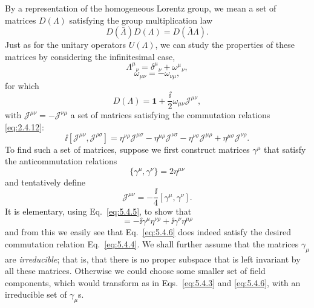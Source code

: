 By a representation of the homogeneous Lorentz group, we mean a set of
matrices $D(\Lambda)$ satisfying the group multiplication law
\[
D(\bar\Lambda)D(\Lambda)=D(\bar\Lambda\Lambda).
\]
Just as for the unitary operators $U(\Lambda)$, we can study the properties of
these matrices by considering the infinitesimal case,
\begin{equation}
\Lambda^\mu{}_\nu=\delta^\mu{}_\nu+\omega^\mu{}_\nu,
\tag{5.4.1}\label{eq:5.4.1}
\end{equation}
\begin{equation}
\omega_{\mu\nu}=-\omega_{\nu\mu},
\tag{5.4.2}\label{eq:5.4.2}
\end{equation}
for which
\begin{equation}
D(\Lambda)=\mathbf{1}+\frac{\ii}{2}\omega_{\mu\nu}\mathcal{J}^{\mu\nu},
\tag{5.4.3}\label{eq:5.4.3}
\end{equation}
with $\mathcal{J}^{\mu\nu}=-\mathcal{J}^{\nu\mu}$ a set of matrices satisfying
the commutation relations \eqref{eq:2.4.12}:
\begin{equation}
\ii[\mathcal{J}^{\mu\nu},\mathcal{J}^{\rho\sigma}]
=\eta^{\nu\rho}\mathcal{J}^{\mu\sigma}
-\eta^{\mu\rho}\mathcal{J}^{\nu\sigma}
-\eta^{\nu\sigma}\mathcal{J}^{\mu\rho}
+\eta^{\mu\sigma}\mathcal{J}^{\nu\rho}.
\tag{5.4.4}\label{eq:5.4.4}
\end{equation}
To find such a set of matrices, suppose we first construct matrices $\gamma^\mu$
that satisfy the anticommutation relations
\begin{equation}
\{\gamma^\mu,\gamma^\nu\}=2\eta^{\mu\nu}
\tag{5.4.5}\label{eq:5.4.5}
\end{equation}
and tentatively define
\begin{equation}
\mathcal{J}^{\mu\nu}=-\frac{\ii}{4}[\gamma^\mu,\gamma^\nu].
\tag{5.4.6}\label{eq:5.4.6}
\end{equation}
It is elementary, using Eq.~\eqref{eq:5.4.5}, to show that
\begin{equation}
[\mathcal{J}^{\mu\nu},\gamma^\rho]
=-\ii\gamma^\mu\eta^{\nu\rho}+\ii\gamma^\nu\eta^{\mu\rho}
\tag{5.4.7}\label{eq:5.4.7}
\end{equation}
and from this we easily see that Eq.~\eqref{eq:5.4.6} does indeed satisfy the desired
commutation relation Eq.~\eqref{eq:5.4.4}. We shall further assume that the matrices
$\gamma_\mu$ are \emph{irreducible}; that is, that there is no proper subspace
that is left invariant by all these matrices. Otherwise we could choose some
smaller set of field components, which would transform as in Eqs.~\eqref{eq:5.4.3} and
\eqref{eq:5.4.6}, with an irreducible set of $\gamma_\mu$s.


